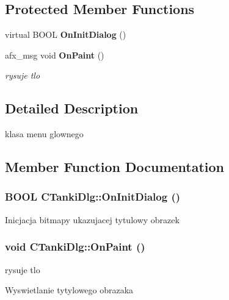 \subsection*{Protected Member Functions}
\begin{CompactItemize}
\item 
virtual BOOL {\bf OnInitDialog} ()
\item 
afx\_\-msg void {\bf OnPaint} ()
\begin{CompactList}\small\item\em rysuje tlo \item\end{CompactList}\end{CompactItemize}


\subsection{Detailed Description}
klasa menu glownego 



\subsection{Member Function Documentation}
\subsubsection{\setlength{\rightskip}{0pt plus 5cm}BOOL CTankiDlg::OnInitDialog ()\hspace{0.3cm}{\tt  [protected, virtual]}}\label{class_c_tanki_dlg_12b2aead4a681788130100d8d8247365}




Inicjacja bitmapy ukazujacej tytulowy obrazek 
\subsubsection{\setlength{\rightskip}{0pt plus 5cm}void CTankiDlg::OnPaint ()\hspace{0.3cm}{\tt  [protected]}}\label{class_c_tanki_dlg_4941fe2a411374a1c1240f976fb06541}


rysuje tlo 



Wyswietlanie tytylowego obrazaka 
